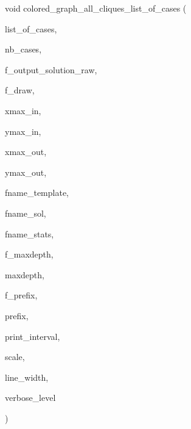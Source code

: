 {\footnotesize\ttfamily void colored\+\_\+graph\+\_\+all\+\_\+cliques\+\_\+list\+\_\+of\+\_\+cases (\begin{DoxyParamCaption}\item[{\mbox{\hyperlink{galois_8h_a09fddde158a3a20bd2dcadb609de11dc}{I\+NT}} $\ast$}]{list\+\_\+of\+\_\+cases,  }\item[{\mbox{\hyperlink{galois_8h_a09fddde158a3a20bd2dcadb609de11dc}{I\+NT}}}]{nb\+\_\+cases,  }\item[{\mbox{\hyperlink{galois_8h_a09fddde158a3a20bd2dcadb609de11dc}{I\+NT}}}]{f\+\_\+output\+\_\+solution\+\_\+raw,  }\item[{\mbox{\hyperlink{galois_8h_a09fddde158a3a20bd2dcadb609de11dc}{I\+NT}}}]{f\+\_\+draw,  }\item[{\mbox{\hyperlink{galois_8h_a09fddde158a3a20bd2dcadb609de11dc}{I\+NT}}}]{xmax\+\_\+in,  }\item[{\mbox{\hyperlink{galois_8h_a09fddde158a3a20bd2dcadb609de11dc}{I\+NT}}}]{ymax\+\_\+in,  }\item[{\mbox{\hyperlink{galois_8h_a09fddde158a3a20bd2dcadb609de11dc}{I\+NT}}}]{xmax\+\_\+out,  }\item[{\mbox{\hyperlink{galois_8h_a09fddde158a3a20bd2dcadb609de11dc}{I\+NT}}}]{ymax\+\_\+out,  }\item[{const \mbox{\hyperlink{galois_8h_ab6cc7b4aeb6ea31aba2b3fbfc83ff5e6}{B\+Y\+TE}} $\ast$}]{fname\+\_\+template,  }\item[{const \mbox{\hyperlink{galois_8h_ab6cc7b4aeb6ea31aba2b3fbfc83ff5e6}{B\+Y\+TE}} $\ast$}]{fname\+\_\+sol,  }\item[{const \mbox{\hyperlink{galois_8h_ab6cc7b4aeb6ea31aba2b3fbfc83ff5e6}{B\+Y\+TE}} $\ast$}]{fname\+\_\+stats,  }\item[{\mbox{\hyperlink{galois_8h_a09fddde158a3a20bd2dcadb609de11dc}{I\+NT}}}]{f\+\_\+maxdepth,  }\item[{\mbox{\hyperlink{galois_8h_a09fddde158a3a20bd2dcadb609de11dc}{I\+NT}}}]{maxdepth,  }\item[{\mbox{\hyperlink{galois_8h_a09fddde158a3a20bd2dcadb609de11dc}{I\+NT}}}]{f\+\_\+prefix,  }\item[{const \mbox{\hyperlink{galois_8h_ab6cc7b4aeb6ea31aba2b3fbfc83ff5e6}{B\+Y\+TE}} $\ast$}]{prefix,  }\item[{\mbox{\hyperlink{galois_8h_a09fddde158a3a20bd2dcadb609de11dc}{I\+NT}}}]{print\+\_\+interval,  }\item[{double}]{scale,  }\item[{double}]{line\+\_\+width,  }\item[{\mbox{\hyperlink{galois_8h_a09fddde158a3a20bd2dcadb609de11dc}{I\+NT}}}]{verbose\+\_\+level }\end{DoxyParamCaption})}


